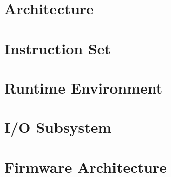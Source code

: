 \documentclass[a4paper, 11pt, openright]{book}
\begin{document}
\part{Architecture}







\part{Instruction Set}





\part{Runtime Environment}




\part{I/O Subsystem}


\part{Firmware Architecture}



\end{document}
